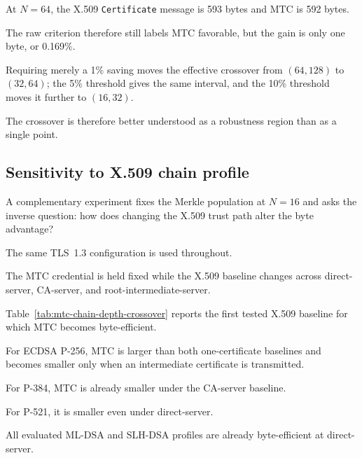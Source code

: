 \documentclass[journal]{IEEEtran}
\begin{document}
At $N=64$, the X.509 \texttt{Certificate} message is 593 bytes and MTC is 592 bytes.

The raw criterion therefore still labels MTC favorable, but the gain is only one byte, or 0.169\%.

Requiring merely a 1\% saving moves the effective crossover from $(64,128)$ to $(32,64)$; the 5\% threshold gives the same interval, and the 10\% threshold moves it further to $(16,32)$.

The crossover is therefore better understood as a robustness region than as a single point.



\subsection{Sensitivity to X.509 chain profile}

\label{sec:chain-depth-sensitivity}



A complementary experiment fixes the Merkle population at $N=16$ and asks the inverse question: how does changing the X.509 trust path alter the byte advantage?

The same TLS~1.3 configuration is used throughout.

The MTC credential is held fixed while the X.509 baseline changes across direct-server, CA-server, and root-intermediate-server.



Table~\ref{tab:mtc-chain-depth-crossover} reports the first tested X.509 baseline for which MTC becomes byte-efficient.

For ECDSA P-256, MTC is larger than both one-certificate baselines and becomes smaller only when an intermediate certificate is transmitted.

For P-384, MTC is already smaller under the CA-server baseline.

For P-521, it is smaller even under direct-server.

All evaluated ML-DSA and SLH-DSA profiles are already byte-efficient at direct-server.
\end{document}
